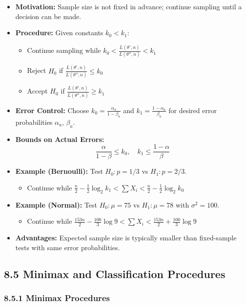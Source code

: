 \begin{itemize}
	\item \textbf{Motivation:} Sample size is not fixed in advance; continue sampling until a decision can be made.
	\item \textbf{Procedure:} Given constants $k_0 < k_1$:
	\begin{itemize}
		\item Continue sampling while $k_0 < \frac{L(\theta', n)}{L(\theta'', n)} < k_1$
		\item Reject $H_0$ if $\frac{L(\theta', n)}{L(\theta'', n)} \leq k_0$
		\item Accept $H_0$ if $\frac{L(\theta', n)}{L(\theta'', n)} \geq k_1$
	\end{itemize}
	\item \textbf{Error Control:} Choose $k_0 = \frac{\alpha_a}{1-\beta_a}$ and $k_1 = \frac{1-\alpha_a}{\beta_a}$ for desired error probabilities $\alpha_a$, $\beta_a$.
	\item \textbf{Bounds on Actual Errors:}
\[
\frac{\alpha}{1-\beta} \leq k_0, \quad k_1 \leq \frac{1-\alpha}{\beta}
\]
	\item \textbf{Example (Bernoulli):} Test $H_0: p = 1/3$ vs $H_1: p = 2/3$.
	\begin{itemize}
		\item Continue while $\frac{n}{2} - \frac{1}{2}\log_2 k_1 < \sum X_i < \frac{n}{2} - \frac{1}{2}\log_2 k_0$
	\end{itemize}
	\item \textbf{Example (Normal):} Test $H_0: \mu = 75$ vs $H_1: \mu = 78$ with $\sigma^2 = 100$.
	\begin{itemize}
		\item Continue while $\frac{153n}{2} - \frac{100}{3}\log 9 < \sum X_i < \frac{153n}{2} + \frac{100}{3}\log 9$
	\end{itemize}
	\item \textbf{Advantages:} Expected sample size is typically smaller than fixed-sample tests with same error probabilities.
\end{itemize}

\subsection{8.5 Minimax and Classification Procedures}

\subsubsection{8.5.1 Minimax Procedures}

